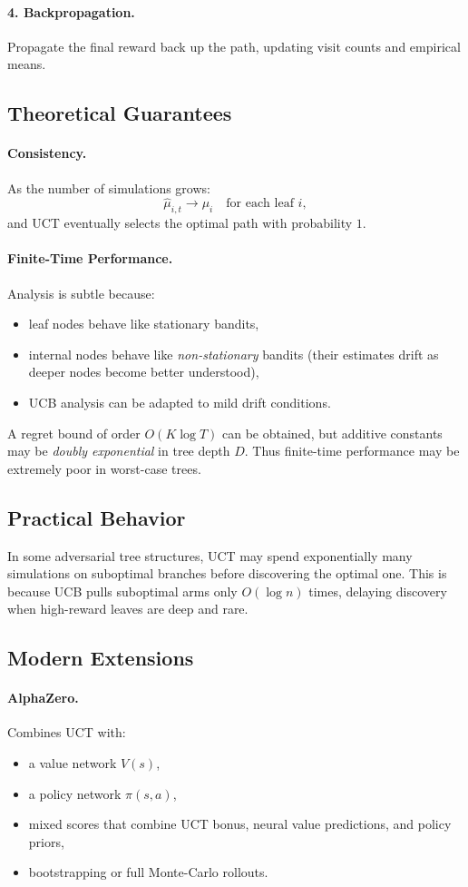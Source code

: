 \documentclass[12pt]{article}
\begin{document}
\paragraph{4. Backpropagation.}
Propagate the final reward back up the path, updating visit counts and empirical means.

\subsection*{Theoretical Guarantees}
\paragraph{Consistency.}
As the number of simulations grows:
\[
		\hat{\mu}_{i,t} \to \mu_i \quad \text{for each leaf } i,
\]
and UCT eventually selects the optimal path with probability $1$.

\paragraph{Finite-Time Performance.}
Analysis is subtle because:
\begin{itemize}
		\item leaf nodes behave like stationary bandits,
		\item internal nodes behave like \emph{non-stationary} bandits (their estimates drift
				as deeper nodes become better understood),
		\item UCB analysis can be adapted to mild drift conditions.
\end{itemize}
A regret bound of order $O(K \log T)$ can be obtained, but additive constants may be
\emph{doubly exponential} in tree depth $D$.
Thus finite-time performance may be extremely poor in worst-case trees.

\subsection*{Practical Behavior}
In some adversarial tree structures, UCT may spend exponentially many simulations
on suboptimal branches before discovering the optimal one.
This is because UCB pulls suboptimal arms only $O(\log n)$ times, delaying discovery
when high-reward leaves are deep and rare.

\subsection*{Modern Extensions}
\paragraph{AlphaZero.}
Combines UCT with:
\begin{itemize}
		\item a value network $V(s)$,
		\item a policy network $\pi(s,a)$,
		\item mixed scores that combine UCT bonus, neural value predictions, and policy priors,
		\item bootstrapping or full Monte-Carlo rollouts.
\end{itemize}
\end{document}
